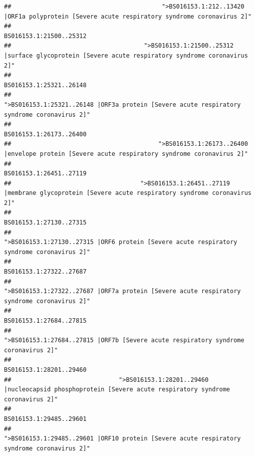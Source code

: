 \documentclass[
]{article}
\begin{document}
\begin{verbatim}
##                                          ">BS016153.1:212..13420 |ORF1a polyprotein [Severe acute respiratory syndrome coronavirus 2]" 
##                                                                                                                BS016153.1:21500..25312 
##                                     ">BS016153.1:21500..25312 |surface glycoprotein [Severe acute respiratory syndrome coronavirus 2]" 
##                                                                                                                BS016153.1:25321..26148 
##                                            ">BS016153.1:25321..26148 |ORF3a protein [Severe acute respiratory syndrome coronavirus 2]" 
##                                                                                                                BS016153.1:26173..26400 
##                                         ">BS016153.1:26173..26400 |envelope protein [Severe acute respiratory syndrome coronavirus 2]" 
##                                                                                                                BS016153.1:26451..27119 
##                                    ">BS016153.1:26451..27119 |membrane glycoprotein [Severe acute respiratory syndrome coronavirus 2]" 
##                                                                                                                BS016153.1:27130..27315 
##                                             ">BS016153.1:27130..27315 |ORF6 protein [Severe acute respiratory syndrome coronavirus 2]" 
##                                                                                                                BS016153.1:27322..27687 
##                                            ">BS016153.1:27322..27687 |ORF7a protein [Severe acute respiratory syndrome coronavirus 2]" 
##                                                                                                                BS016153.1:27684..27815 
##                                                    ">BS016153.1:27684..27815 |ORF7b [Severe acute respiratory syndrome coronavirus 2]" 
##                                                                                                                BS016153.1:28201..29460 
##                              ">BS016153.1:28201..29460 |nucleocapsid phosphoprotein [Severe acute respiratory syndrome coronavirus 2]" 
##                                                                                                                BS016153.1:29485..29601 
##                                            ">BS016153.1:29485..29601 |ORF10 protein [Severe acute respiratory syndrome coronavirus 2]" 

\end{verbatim}
\end{document}
